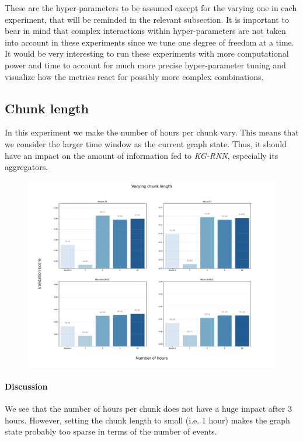 These are the hyper-parameters to be assumed except for the varying one in each experiment, that will be reminded in the relevant subsection. It is important to bear in mind that complex interactions within hyper-parameters are not taken into account in these experiments since we tune one degree of freedom at a time. \\

It would be very interesting to run these experiments with more computational power and time to account for much more precise hyper-parameter tuning and visualize how the metrics react for possibly more complex combinations.

\newpage
\subsection{Chunk length}
In this experiment we make the number of hours per chunk vary. This means that we consider the larger time window as the current graph state. Thus, it should have an impact on the amount of information fed to \emph{KG-RNN}, especially its aggregators.

\begin{figure}[H]
 \centering
 \includegraphics[width=\textwidth]{figures/exp-hours.pdf}
\end{figure}

\paragraph{Discussion} We see that the number of hours per chunk does not have a huge impact after 3 hours. However, setting the chunk length to small (i.e. 1 hour) makes the graph state probably too sparse in terms of the number of events.

